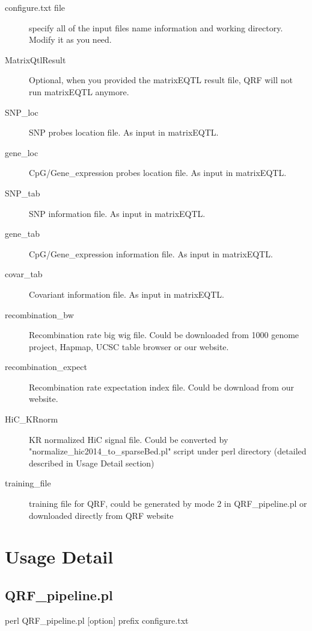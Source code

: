 \documentclass[12pt]{article}
\begin{document}
\begin{description}

\item[configure.txt file] specify all of the input files name information and working directory. Modify it as you need.
\item[MatrixQtlResult] Optional, when you provided the matrixEQTL result file, QRF will not run matrixEQTL anymore. 
\item[SNP\_loc] SNP probes location file. As input in matrixEQTL. 
\item[gene\_loc] CpG/Gene\_expression probes location file. As input in matrixEQTL.  
\item[SNP\_tab] SNP  information file. As input in matrixEQTL.
\item[gene\_tab] CpG/Gene\_expression  information file. As input in matrixEQTL.
\item[covar\_tab] Covariant information file. As input in matrixEQTL.
\item[recombination\_bw] Recombination rate big wig file. Could be downloaded from 1000 genome project, Hapmap, UCSC table browser or our website.
\item[recombination\_expect] Recombination rate expectation index file. Could be download from our website. 
\item[HiC\_KRnorm] KR normalized HiC signal file. Could be converted by  "normalize\_hic2014\_to\_sparseBed.pl" script under perl directory (detailed described in Usage Detail section) 
\item[training\_file] training file for QRF, could be generated by mode 2 in QRF\_pipeline.pl or downloaded directly from QRF website

\end{description}

{\color{red}\section{Usage Detail}}
{\color{blue}\subsection{QRF\_pipeline.pl}}
 \begin{verbatimtab}
perl QRF_pipeline.pl [option] prefix configure.txt
\end{verbatimtab}
\end{document}

